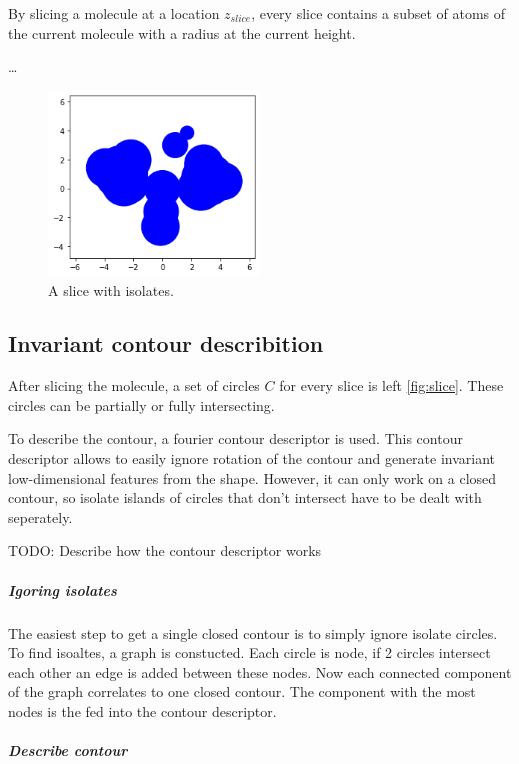 By slicing a molecule at a location $z_{slice}$, every slice contains a subset of atoms of the current molecule with a radius at the current height.

\dots

\begin{figure} [h]
  \centering
  \includegraphics[width=0.5\textwidth]{figures/slice-iso.png} %
  \caption{A slice with isolates.}
  \label{fig:slice}
\end{figure}

\subsection{Invariant contour describition}

After slicing the molecule, a set of circles $C$ for every slice is left \autoref{fig:slice}.
These circles can be partially or fully intersecting. 

To describe the contour, a fourier contour descriptor is used.
This contour descriptor allows to easily ignore rotation of the contour and generate invariant low-dimensional features from the shape.
However, it can only work on a closed contour, so isolate islands of circles that don't intersect have to be dealt with seperately.

TODO: Describe how the contour descriptor works

\subparagraph{Igoring isolates} 

The easiest step to get a single closed contour is to simply ignore isolate circles.
To find isoaltes, a graph is constucted. 
Each circle is node, if 2 circles intersect each other an edge is added between these nodes.
Now each connected component of the graph correlates to one closed contour. 
The component with the most nodes is the fed into the contour descriptor.

\subparagraph{Describe contour}

